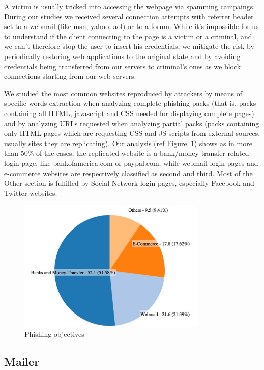 A victim is usually tricked into accessing the webpage via spamming campaings. During our studies we received several connection attempts with referrer header set to a webmail (like msn, yahoo, aol) or to a forum. While it's impossible for us to understand if the client connecting to the page is a victim or a criminal, and we can't therefore stop the user to insert his credentials, we mitigate the risk by periodically restoring web applications to the original state and by avoiding credentials being transferred from our servers to criminal's ones as we block connections starting from our web servers.

We studied the most common websites reproduced by attackers by means of specific words extraction when analyzing complete phishing packs (that is, packs containing all HTML, javascript and CSS needed for displaying complete pages) and by analyzing URLs requested when analyzing partial packs (packs containing only HTML pages which are requesting CSS and JS scripts from external sources, usually sites they are replicating). Our analysis (ref Figure~\ref{fig:phishGraph}) shows as in more than 50\% of the cases, the replicated website is a bank/money-transfer related login page, like bankofamerica.com or paypal.com, while webmail login pages and e-commerce websites are respectively classified as second and third. Most of the Other section is fulfilled by Social Network login pages, especially Facebook and Twitter websites.

\begin{figure}[H]
\centerline{\includegraphics[width=0.8\textwidth]{Images/phishGraph.jpg}}
\caption{Phishing objectives\label{fig:phishGraph}}
\end{figure}

\subsection{Mailer}

